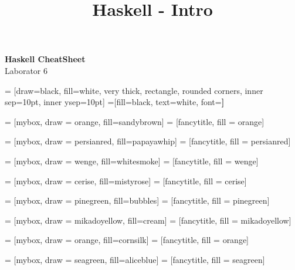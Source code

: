 \documentclass[a4paper]{article}
\title{Haskell - Intro}
\begin{document}
\begin{center}{\huge{\textbf{Haskell CheatSheet}}}\\
{\large Laborator 6}
\end{center}

\begin{multicols*}{3}

 = [draw=black, fill=white, very thick,
    rectangle, rounded corners, inner sep=10pt, inner ysep=10pt]
 =[fill=black, text=white, font=\bfseries]

 = [mybox, draw = orange, fill=sandybrown]
 = [fancytitle, fill = orange]


 = [mybox, draw = persianred, fill=papayawhip]
 = [fancytitle, fill = persianred]

 = [mybox, draw = wenge, fill=whitesmoke]
 = [fancytitle, fill = wenge]

 = [mybox, draw = cerise, fill=mistyrose]
 = [fancytitle, fill = cerise]

 = [mybox, draw = pinegreen, fill=bubbles]
 = [fancytitle, fill = pinegreen]

 = [mybox, draw = mikadoyellow, fill=cream]
 = [fancytitle, fill = mikadoyellow]

 = [mybox, draw = orange, fill=cornsilk]
 = [fancytitle, fill = orange]

 = [mybox, draw = seagreen, fill=aliceblue]
 = [fancytitle, fill = seagreen]


\end{multicols*}
\end{document}
